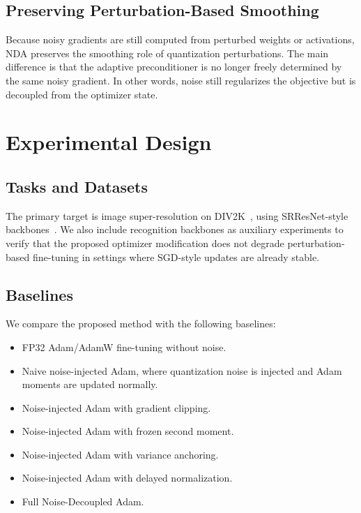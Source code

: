 \documentclass[journal]{IEEEtran}
\begin{document}
\subsection{Preserving Perturbation-Based Smoothing}
Because noisy gradients are still computed from perturbed weights or activations, NDA preserves the smoothing role of quantization perturbations. The main difference is that the adaptive preconditioner is no longer freely determined by the same noisy gradient. In other words, noise still regularizes the objective but is decoupled from the optimizer state.

\section{Experimental Design}

\subsection{Tasks and Datasets}
The primary target is image super-resolution on DIV2K~\cite{agustsson2017div2k}, using SRResNet-style backbones~\cite{ledig2017srgan}. We also include recognition backbones as auxiliary experiments to verify that the proposed optimizer modification does not degrade perturbation-based fine-tuning in settings where SGD-style updates are already stable.

\subsection{Baselines}
We compare the proposed method with the following baselines:
\begin{itemize}
    \item FP32 Adam/AdamW fine-tuning without noise.
    \item Naive noise-injected Adam, where quantization noise is injected and Adam moments are updated normally.
    \item Noise-injected Adam with gradient clipping.
    \item Noise-injected Adam with frozen second moment.
    \item Noise-injected Adam with variance anchoring.
    \item Noise-injected Adam with delayed normalization.
    \item Full Noise-Decoupled Adam.
\end{itemize}
\end{document}
